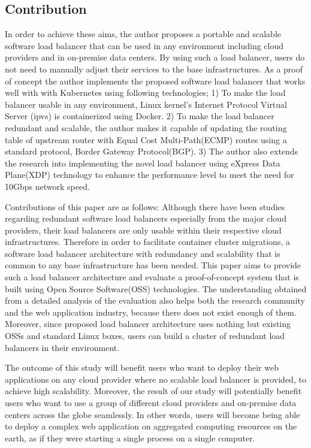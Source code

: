 \subsection{Contribution}

In order to achieve these aims, the author proposes a portable and scalable software load balancer that can be used in any environment including cloud providers and in on-premise data centers.
By using such a load balancer, users do not need to manually adjust their services to the base infrastructures.
As a proof of concept the author implements the proposed software load balancer that works well with with Kubernetes using following technologies;
1) To make the load balancer usable in any environment, Linux kernel's Internet Protocol Virtual Server (ipvs)\cite{Zhang2000} is containerized using Docker\cite{merkel2014docker}. 
2) To make the load balancer redundant and scalable, the author makes it capable of updating the routing table of upstream router with Equal Cost Multi-Path(ECMP) routes\cite{al2008scalable} using a standard protocol, Border Gateway Protocol(BGP).
3) The author also extends the research into implementing the novel load balancer using eXpress Data Plane(XDP) technology\cite{bertin2017xdp} to enhance the performance level to meet the need for 10Gbps network speed.

Contributions of this paper are as follows:
Although there have been studies regarding redundant software load balancers especially from the major cloud providers\cite{eisenbud2016maglev,patel2013ananta}, their load balancers are only usable within their respective cloud infrastructures.
Therefore in order to facilitate container cluster migrations, a software load balancer architecture with redundancy and scalability that is common to any base infrastructure has been needed.
This paper aims to provide such a load balancer architecture and evaluate a proof-of-concept system that is built using Open Source Software(OSS) technologies.
The understanding obtained from a detailed analysis of the evaluation also helps both the research community and the web application industry, because there does not exist enough of them.
Moreover, since proposed load balancer architecture uses nothing but existing OSSs and standard Linux boxes, users can build a cluster of redundant load balancers in their environment.

The outcome of this study will benefit users who want to deploy their web applications on any cloud provider where no scalable load balancer is provided, to achieve high scalability.
Moreover, the result of our study will potentially benefit users who want to use a group of different cloud providers and on-premise data centers across the globe seamlessly.
In other words, users will become being able to deploy a complex web application on aggregated computing resources on the earth, as if they were starting a single process on a single computer.


